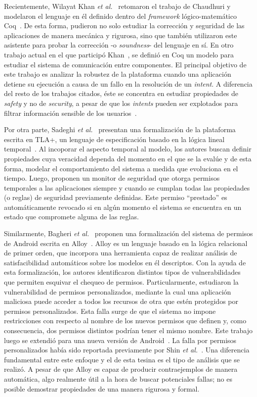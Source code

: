 Recientemente, Wilayat Khan \textit{et al.}~\cite{khan} retomaron el trabajo de Chaudhuri y
modelaron el lenguaje en él definido dentro del \textit{framework} lógico-matemático Coq~\cite{coq}.
De esta forma, pudieron no solo estudiar la corrección y seguridad de las aplicaciones de manera
mecánica y rigurosa, sino que también utilizaron este asistente para probar la corrección -o
\textit{soundness}- del lenguaje en sí. En otro trabajo actual en el que participó
Khan~\cite{crashsafe}, se definió en Coq un modelo para estudiar el sistema de comunicación entre
componentes. El principal objetivo de este trabajo es analizar la robustez de la plataforma cuando
una aplicación detiene su ejecución a causa de un fallo en la resolución de un \textit{intent}. A
diferencia del resto de los trabajos citados, éste se concentra en estudiar propiedades de
\textit{safety} y no de \textit{security}, a pesar de que los \textit{intents} pueden ser explotados
para filtrar información sensible de los usuarios~\cite{iccta}.

Por otra parte, Sadeghi \textit{et al.}~\cite{sadeghi-temp} presentan una formalización de la
plataforma escrita en TLA+, un lenguaje de especificación basado en la lógica lineal
temporal~\cite{tla+}. Al incoporar el aspecto temporal al modelo, los autores buscan definir
propiedades cuya veracidad dependa del momento en el que se la evalúe y de esta forma, modelar el
comportamiento del sistema a medida que evoluciona en el tiempo. Luego, proponen un monitor de
seguridad que otorga permisos temporales a las aplicaciones siempre y cuando se cumplan todas las
propiedades (o reglas) de seguridad previamente definidas. Este permiso ``prestado'' es
automáticamente revocado si en algún momento el sistema se encuentra en un estado que compromete
alguna de las reglas.

Similarmente, Bagheri \textit{et al.}~\cite{bagheri15} proponen una formalización del sistema de
permisos de Android escrita en Alloy~\cite{alloy}. Alloy es un lenguaje basado en la lógica
relacional de primer orden, que incorpora una herramienta capaz de realizar análisis de
satisfacibilidad automáticos sobre los modelos en él descriptos. Con la ayuda de esta formalización,
los autores identificaron distintos tipos de vulnerabilidades que permiten esquivar el chequeo de
permisos. Particularmente, estudiaron la vulnerabilidad de permisos personalizados, mediante la cual
una aplicación maliciosa puede acceder a todos los recursos de otra que estén protegidos por
permisos personalizados. Esta falla surge de que el sistema no impone restricciones con respecto al
nombre de los nuevos permisos que definen y, como consecuencia, dos permisos distintos podrían tener
el mismo nombre. Este trabajo luego se extendió para una nueva versión de Android~\cite{bagheri}. La
falla por permisos personalizados había sido reportada previamente por Shin \textit{et
    al.}~\cite{shin-custom}. Una diferencia fundamental entre este enfoque y el de esta tesina es el
tipo de análisis que se realizó. A pesar de que Alloy es capaz de producir contraejemplos de manera
automática, algo realmente útil a la hora de buscar potenciales fallas; no es posible demostrar
propiedades de una manera rigurosa y formal.

